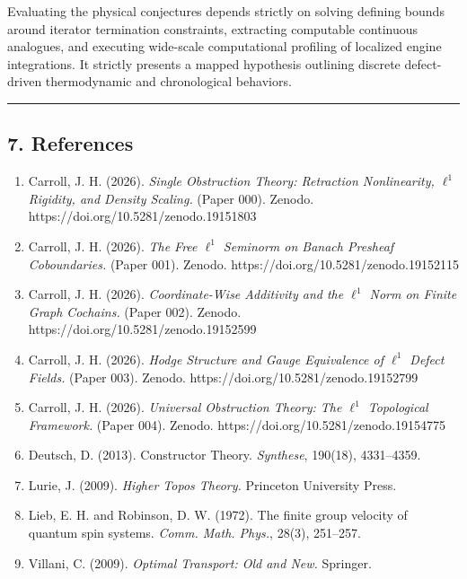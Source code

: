 \documentclass[
]{article}
\providecommand{\tightlist}{%
  \setlength{\itemsep}{0pt}\setlength{\parskip}{0pt}}
\begin{document}
Evaluating the physical conjectures depends strictly on solving defining
bounds around iterator termination constraints, extracting computable
continuous analogues, and executing wide-scale computational profiling
of localized engine integrations. It strictly presents a mapped
hypothesis outlining discrete defect-driven thermodynamic and
chronological behaviors.

\begin{center}\rule{0.5\linewidth}{0.5pt}\end{center}

\subsection{7. References}\label{references}

\begin{enumerate}
\def\labelenumi{\arabic{enumi}.}
\tightlist
\item
  Carroll, J. H. (2026). \emph{Single Obstruction Theory: Retraction
  Nonlinearity, \(\ell^1\) Rigidity, and Density Scaling.} (Paper 000).
  Zenodo. https://doi.org/10.5281/zenodo.19151803
\item
  Carroll, J. H. (2026). \emph{The Free \(\ell^1\) Seminorm on Banach
  Presheaf Coboundaries.} (Paper 001). Zenodo.
  https://doi.org/10.5281/zenodo.19152115
\item
  Carroll, J. H. (2026). \emph{Coordinate-Wise Additivity and the
  \(\ell^1\) Norm on Finite Graph Cochains.} (Paper 002). Zenodo.
  https://doi.org/10.5281/zenodo.19152599
\item
  Carroll, J. H. (2026). \emph{Hodge Structure and Gauge Equivalence of
  \(\ell^1\) Defect Fields.} (Paper 003). Zenodo.
  https://doi.org/10.5281/zenodo.19152799
\item
  Carroll, J. H. (2026). \emph{Universal Obstruction Theory: The
  \(\ell^1\) Topological Framework.} (Paper 004). Zenodo.
  https://doi.org/10.5281/zenodo.19154775
\item
  Deutsch, D. (2013). Constructor Theory. \emph{Synthese}, 190(18),
  4331--4359.
\item
  Lurie, J. (2009). \emph{Higher Topos Theory.} Princeton University
  Press.
\item
  Lieb, E. H. and Robinson, D. W. (1972). The finite group velocity of
  quantum spin systems. \emph{Comm. Math. Phys.}, 28(3), 251--257.
\item
  Villani, C. (2009). \emph{Optimal Transport: Old and New.} Springer.
\end{enumerate}
\end{document}
